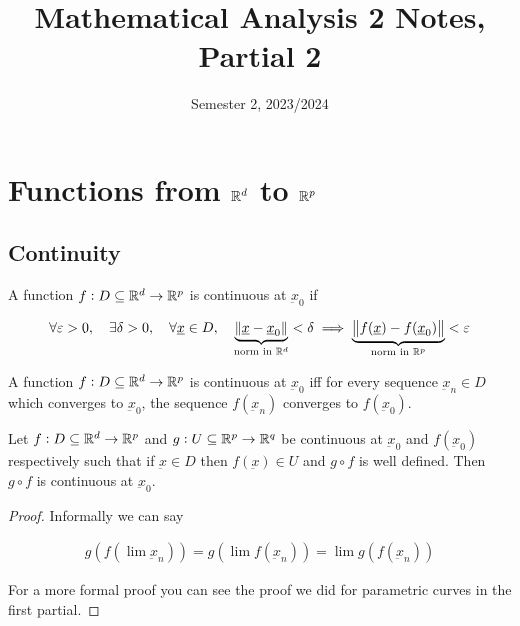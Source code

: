 \documentclass[12pt]{report}
\title{Mathematical Analysis 2 Notes, Partial 2}
\date{Semester 2, 2023/2024}
\renewcommand{\vec}[1]{\underbar{\ensuremath{#1}}}
\begin{document}
\maketitle
\tableofcontents
\clearpage

\chapter{Functions from \texorpdfstring{$\mathbb{R}^d$}{Rd} to \texorpdfstring{$\mathbb{R}^p$}{Rp}}

\section{Continuity}

\begin{definition}[continuity]
    A function $f: D \subseteq \mathbb{R}^d \to \mathbb{R}^p$ is continuous at $\vec{x}_0$ if

    $$
        \forall \varepsilon > 0,
        \quad
        \exists \delta > 0,
        \quad
        \forall \vec{x} \in D,
        \quad
        \underbrace{\norm{\vec{x} - \vec{x}_0}}_{\text{norm in } \R^d} < \delta
        \implies
        \underbrace{\norm{f(\vec{x}) - f(\vec{x}_0)}}_{\text{norm in } \R^p} < \varepsilon
    $$
\end{definition}

\begin{proposition}
    A function $f: D \subseteq \mathbb{R}^d \to \mathbb{R}^p$ is continuous at $\vec{x}_0$ iff for every sequence $\vec{x}_n \in D$ which converges to $\vec{x}_0$, the sequence $f(\vec{x}_n)$ converges to $f(\vec{x}_0)$.
\end{proposition}

\begin{proposition}
    Let $f: D \subseteq \mathbb{R}^d \to \mathbb{R}^p$ and $g: U \subseteq \mathbb{R}^p \to \mathbb{R}^q$ be continuous at $\vec{x}_0$ and $f(\vec{x}_0)$ respectively such that if $\vec{x} \in D$ then $f(\vec{x}) \in U$ and $g \circ f$ is well defined.
    Then $g \circ f$ is continuous at $\vec{x}_0$.
\end{proposition}

\begin{proof}
    Informally we can say

    \begin{align*}
        g(f(\lim \vec{x}_n)) = g(\lim f(\vec{x}_n)) = \lim g(f(\vec{x}_n))
    \end{align*}

    For a more formal proof you can see the proof we did for parametric curves in the first partial.
\end{proof}
\end{document}
